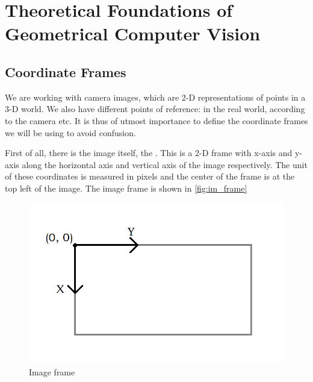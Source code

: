 \chapter{Theoretical Foundations of Geometrical Computer Vision}\label{chap:theoretic_found}


\section{Coordinate Frames}
We are working with camera images, which are 2-D representations of points in a 3-D world. We also have different points of reference: in the real world, according to the camera etc. It is thus of utmost importance to define the coordinate frames we will be using to avoid confusion.\bigskip

First of all, there is the image itself, the . This is a 2-D frame with x-axis and y-axis along the horizontal axis and vertical axis of the image respectively. The unit of these coordinates is measured in pixels and the center of the frame is at the top left of the image. The image frame is shown in \autoref{fig:im_frame}\bigskip

\begin{figure}
    \centering
    \includegraphics[width=1\textwidth]{figures/image_frame.png}
    \caption{Image frame}
    \label{fig:im_frame}
\end{figure}


